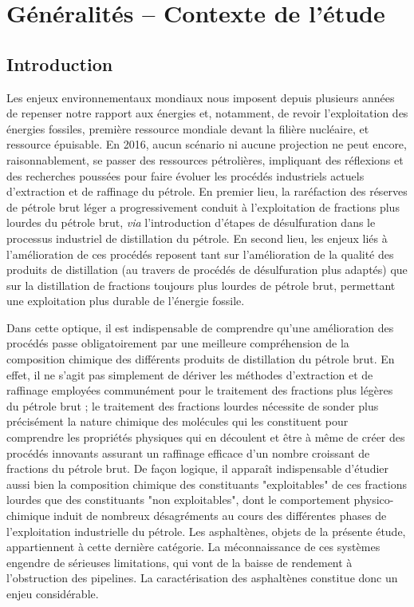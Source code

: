 \chapter{Généralités -- Contexte de l'étude}
\minitoc
\restoregeometry

\newpage	
	\section*{Introduction}
	
Les enjeux environnementaux mondiaux nous imposent depuis plusieurs années de repenser notre rapport aux énergies et, notamment, de revoir l'exploitation des énergies fossiles, première ressource mondiale devant la filière nucléaire, et ressource épuisable. En 2016, aucun scénario ni aucune projection ne peut encore, raisonnablement, se passer des ressources pétrolières, impliquant des réflexions et des recherches poussées pour faire évoluer les procédés industriels actuels d'extraction et de raffinage du pétrole. En premier lieu, la raréfaction des réserves de pétrole brut léger a progressivement conduit à l'exploitation de fractions plus lourdes du pétrole brut, \textit{via} l'introduction d'étapes de désulfuration dans le processus industriel de distillation du pétrole. En second lieu, les enjeux liés à l'amélioration de ces procédés reposent tant sur l'amélioration de la qualité des produits de distillation (au travers de procédés de désulfuration plus adaptés) que sur la distillation de fractions toujours plus lourdes de pétrole brut, permettant une exploitation plus durable de l'énergie fossile. 

Dans cette optique, il est indispensable de comprendre qu'une amélioration des procédés passe obligatoirement par une meilleure compréhension de la composition chimique des différents produits de distillation du pétrole brut. En effet, il ne s'agit pas simplement de dériver les méthodes d'extraction et de raffinage employées communément pour le traitement des fractions plus légères du pétrole brut ; le traitement des fractions lourdes nécessite de sonder plus précisément la nature chimique des molécules qui les constituent pour comprendre les propriétés physiques qui en découlent et être à même de créer des procédés innovants assurant un raffinage efficace d'un nombre croissant de fractions du pétrole brut. De façon logique, il apparaît indispensable d'étudier aussi bien la composition chimique des constituants "exploitables" de ces fractions lourdes que des constituants "non exploitables", dont le comportement physico-chimique induit de nombreux désagréments au cours des différentes phases de l'exploitation industrielle du pétrole. Les asphaltènes, objets de la présente étude, appartiennent à cette dernière catégorie. La méconnaissance de ces systèmes engendre de sérieuses limitations, qui vont de la baisse de rendement à l'obstruction des pipelines. La caractérisation des asphaltènes constitue donc un enjeu considérable. 

